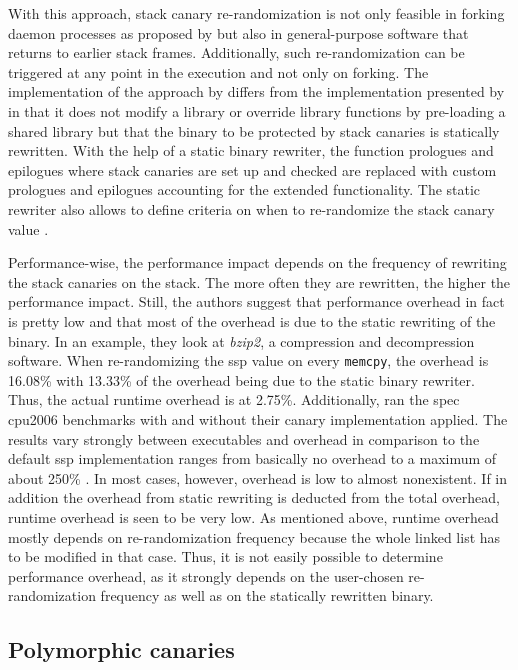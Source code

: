 With this approach, stack canary re-randomization is not only feasible in forking daemon processes as proposed by \citeauthor{MarcoGisbert2013} \cite{MarcoGisbert2013} but also in general-purpose software that returns to earlier stack frames.
Additionally, such re-randomization can be triggered at any point in the execution and not only on forking.
The implementation of the approach by \citeauthor{Hawkins2016} differs from the implementation presented by \citeauthor{MarcoGisbert2013} in that it does not modify a library or override library functions by pre-loading a shared library but that the binary to be protected by stack canaries is statically rewritten.
With the help of a static binary rewriter, the function prologues and epilogues where stack canaries are set up and checked are replaced with custom prologues and epilogues accounting for the extended functionality.
The static rewriter also allows to define criteria on when to re-randomize the stack canary value \cite{Hawkins2016}.

Performance-wise, the performance impact depends on the frequency of rewriting the stack canaries on the stack.
The more often they are rewritten, the higher the performance impact.
Still, the authors suggest that performance overhead in fact is pretty low and that most of the overhead is due to the static rewriting of the binary.
In an example, they look at \emph{bzip2}, a compression and decompression software.
When re-randomizing the \gls{ssp} value on every \texttt{memcpy}, the overhead is 16.08\% with 13.33\% of the overhead being due to the static binary rewriter.
Thus, the actual runtime overhead is at 2.75\%.
Additionally, \citeauthor{Hawkins2016} ran the \gls{spec} \acs{cpu}2006 benchmarks with and without their canary implementation applied.
The results vary strongly between executables and overhead in comparison to the default \gls{ssp} implementation ranges from basically no overhead to a maximum of about 250\% \cite{Hawkins2016}.
In most cases, however, overhead is low to almost nonexistent.
If in addition the overhead from static rewriting is deducted from the total overhead, runtime overhead is seen to be very low.
As mentioned above, runtime overhead mostly depends on re-randomization frequency because the whole linked list has to be modified in that case.
Thus, it is not easily possible to determine performance overhead, as it strongly depends on the user-chosen re-randomization frequency as well as on the statically rewritten binary.

\subsection{Polymorphic canaries}
\label{subsec:polymorphic-canaries}

